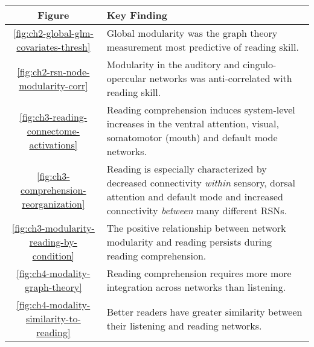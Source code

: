 \begin{tabular}{c|p{10cm}}
\toprule 
Figure & Key Finding \\ 
\midrule 
\ref{fig:ch2-global-glm-covariates-thresh} & Global modularity was the graph theory measurement most predictive of reading skill. \\ 
 \ref{fig:ch2-rsn-node-modularity-corr} & Modularity in the auditory and cingulo-opercular networks was anti-correlated with reading skill.	\\ 
\ref{fig:ch3-reading-connectome-activations} & Reading comprehension induces system-level increases in the ventral attention, visual, somatomotor (mouth) and default mode networks.	 \\ 
\ref{fig:ch3-comprehension-reorganization}  & Reading is especially characterized by decreased connectivity \textit{within} sensory, dorsal attention and default mode and increased connectivity \textit{between} many different RSNs.  \\ 
\ref{fig:ch3-modularity-reading-by-condition}  & The positive relationship between network modularity and reading persists during reading comprehension.  \\ 
\ref{fig:ch4-modality-graph-theory}  & Reading comprehension requires more more integration across networks than listening. \\ 
\ref{fig:ch4-modality-similarity-to-reading} & Better readers have greater similarity between their listening and reading networks.
\bottomrule 
\end{tabular}